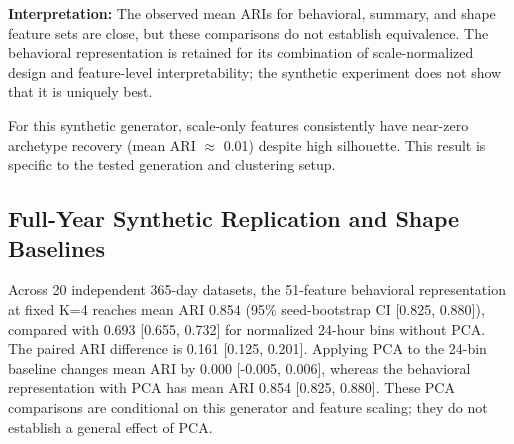 \documentclass[11pt,a4paper]{article}
\begin{document}
\textbf{Interpretation:} The observed mean ARIs for behavioral, summary, and shape feature sets are close, but these comparisons do not establish equivalence. The behavioral representation is retained for its combination of scale-normalized design and feature-level interpretability; the synthetic experiment does not show that it is uniquely best.

For this synthetic generator, scale-only features consistently have near-zero archetype recovery (mean ARI $\approx$ 0.01) despite high silhouette. This result is specific to the tested generation and clustering setup.

\subsection{Full-Year Synthetic Replication and Shape Baselines}
\label{sec:synthetic_replication}

Across 20 independent 365-day datasets, the 51-feature behavioral representation at fixed K=4 reaches mean ARI 0.854 (95\% seed-bootstrap CI [0.825, 0.880]), compared with 0.693 [0.655, 0.732] for normalized 24-hour bins without PCA. The paired ARI difference is 0.161 [0.125, 0.201]. Applying PCA to the 24-bin baseline changes mean ARI by 0.000 [-0.005, 0.006], whereas the behavioral representation with PCA has mean ARI 0.854 [0.825, 0.880]. These PCA comparisons are conditional on this generator and feature scaling; they do not establish a general effect of PCA.

\begin{table}[ht]
\centering
\scriptsize
\caption{Full-year synthetic recovery across 20 independent generator seeds. Intervals bootstrap seeds, not consumers or households.}
\label{tab:synthetic_365_replication}
\end{table}
\end{document}
